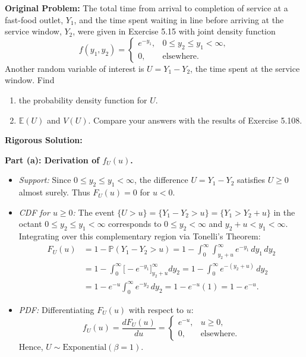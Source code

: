 \documentclass[11pt, letterpaper]{article}
\theoremstyle{definition}
\theoremstyle{remark}
\newcommand{\E}{\mathbb{E}}
\newcommand{\Prob}{\mathbb{P}}
\begin{document}
\textbf{Original Problem:}
The total time from arrival to completion of service at a fast-food outlet, $Y_1$, and the time spent waiting in line before arriving at the service window, $Y_2$, were given in Exercise 5.15 with joint density function
\[
    f(y_1, y_2) = \begin{cases} e^{-y_1}, & 0 \le y_2 \le y_1 < \infty, \\ 0, & \text{elsewhere.} \end{cases}
\]
Another random variable of interest is $U = Y_1 - Y_2$, the time spent at the service window. Find
\begin{enumerate}[label=\textbf{\alph*}]
    \item the probability density function for $U$.
    \item $\E(U)$ and $V(U)$. Compare your answers with the results of Exercise 5.108.
\end{enumerate}

\hrulefill

\textbf{Rigorous Solution:}

\textbf{Part (a): Derivation of $f_U(u)$.}
\begin{itemize}
    \item \textit{Support:} Since $0 \le y_2 \le y_1 < \infty$, the difference $U = Y_1 - Y_2$ satisfies $U \ge 0$ almost surely. Thus $F_U(u) = 0$ for $u < 0$.
    \item \textit{CDF for $u \ge 0$:} The event $\{U > u\} = \{Y_1 - Y_2 > u\} = \{Y_1 > Y_2 + u\}$ in the octant $0 \le y_2 \le y_1 < \infty$ corresponds to $0 \le y_2 < \infty$ and $y_2 + u < y_1 < \infty$. Integrating over this complementary region via Tonelli's Theorem:
    \begin{align*}
        F_U(u) &= 1 - \Prob(Y_1 - Y_2 > u) = 1 - \int_{0}^{\infty} \int_{y_2 + u}^{\infty} e^{-y_1}\,dy_1\,dy_2 \\
        &= 1 - \int_{0}^{\infty} \Big[ -e^{-y_1} \Big]_{y_2 + u}^{\infty} dy_2 = 1 - \int_{0}^{\infty} e^{-(y_2 + u)}\,dy_2 \\
        &= 1 - e^{-u} \int_{0}^{\infty} e^{-y_2}\,dy_2 = 1 - e^{-u}(1) = 1 - e^{-u}.
    \end{align*}
    \item \textit{PDF:} Differentiating $F_U(u)$ with respect to $u$:
    \[
        f_U(u) = \frac{dF_U(u)}{du} = \begin{cases} e^{-u}, & u \ge 0, \\ 0, & \text{elsewhere.} \end{cases}
    \]
    Hence, $U \sim \text{Exponential}(\beta = 1)$.
\end{itemize}
\end{document}
